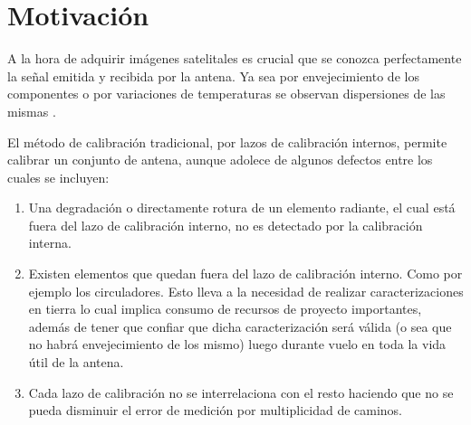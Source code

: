 \begin{comment}
En esta tesis se realizarán las siguientes tareas:

\begin{enumerate}
    \item Se explicarán las ventajas y desventajas del método propuesto respecto del tradicional.
    \item Se analizarán y propondorán los requerimientos para poder implementarlo.
    \item Se desarrollará un modelo de un conjunto de antena polarimétrico con fase variable básico, representativo en 
		parámetros S \cite{Caspers}.
    \item Se añadirán al mismo parámetros de dispersión de comportamiento que 
			permitan analizar su comportamiento.
    \item Se realizará un modelo de calibración que será implementado algoritimicamente.
\end{enumerate}
\end{comment}


\section{Motivación}

A la hora de adquirir imágenes satelitales es crucial que se conozca perfectamente la señal emitida y recibida por la antena. 
Ya sea por envejecimiento de los componentes \cite{Agrawal2003} o por variaciones de temperaturas se observan dispersiones de 
las mismas \cite{Keizer2011}. 

El método de calibración tradicional, por lazos de calibración internos, permite calibrar un conjunto de antena, aunque 
adolece de algunos defectos entre los cuales se incluyen:

\begin{enumerate}
    \item Una degradación o directamente rotura de un elemento radiante, el cual está fuera del lazo de calibración interno, no 
			es detectado por la calibración interna.
    \item Existen elementos que quedan fuera del lazo de calibración interno. Como por ejemplo los circuladores. Esto lleva a 
			la necesidad de realizar caracterizaciones en tierra lo cual implica consumo de recursos de proyecto importantes, 
			además de tener que confiar que dicha caracterización será válida (o sea que no habrá envejecimiento de los mismo) 
			luego durante vuelo en toda la vida útil de la antena.
    \item Cada lazo de calibración no se interrelaciona con el resto haciendo que no se pueda disminuir el error de medición por 
			multiplicidad de caminos.
\end{enumerate}


